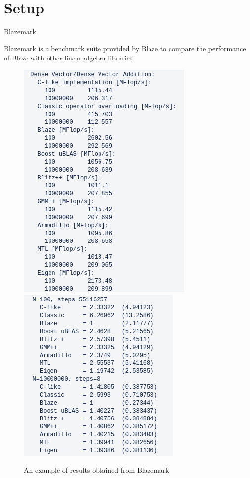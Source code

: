 \documentclass[10pt]{beamer}
\begin{document}
\section{Setup}
\begin{frame}{Blazemark}
	\begin{outline}
		Blazemark is a benchmark suite provided by Blaze to compare the performance of Blaze with other linear algebra libraries. 
		\begin{figure}
			\includegraphics[width=0.42\linewidth]{images/blazemark_1.png}
			\hfill\includegraphics[width=0.41\linewidth]{images/blazemark_2.png}
			\caption{An example of results obtained from Blazemark}	
		\end{figure}
	\end{outline}
\end{frame}
\end{document}
